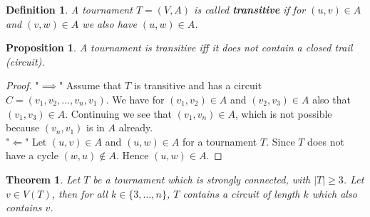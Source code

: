 \documentclass[12pt,a4paper]{article}
\newtheorem{thm}{Theorem}[section]
\newtheorem{prop}{Proposition}[section]
\newtheorem{defn}{Definition}[section]
\theoremstyle{definition}
\begin{document}
\begin{defn} A tournament $T=(V,A)$ is called \textbf{transitive} if for $(u,v) \in A$ and $(v,w) \in A$ we also have $(u,w) \in A$.  
\end{defn}
\begin{prop} A tournament is transitive iff it does not contain  a closed trail (circuit).
\end{prop}
\begin{proof}
"$\implies$" Assume that $T$ is transitive and has a circuit $C=(v_1,v_2, \dots , v_n,v_1)$. We have for $(v_1,v_2) \in A$ and $(v_2,v_3) \in A$ also that $(v_1,v_3) \in A$. Continuing we see that $(v_1,v_n) \in A$, which is not possible because $(v_n,v_1)$ is  in $A$ already. \\
"$\Longleftarrow$" Let $(u,v) \in A$ and $(u,w) \in A$ for a tournament $T$. Since $T$ does not have a cycle $(w, u) \notin A$. Hence $(u,w) \in A$. 
\end{proof}
\begin{thm} Let $T$ be a tournament which is strongly connected, with $|T| \geq 3$. Let $v \in V(T)$, then for all $k \in \{3, \dots , n\}$, $T$ contains a circuit of length $k$ which also contains $v$. 
\end{thm}
\end{document}

